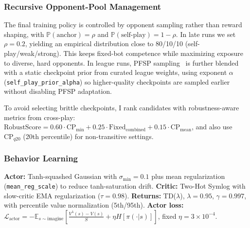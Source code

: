 \documentclass[11pt]{article}
\begin{document}
\subsubsection{Recursive Opponent-Pool Management}

The final training policy is controlled by opponent sampling rather than reward shaping, with $\mathbb{P}(\text{anchor})=\rho$ and $\mathbb{P}(\text{self-play})=1-\rho$.
In late runs we set $\rho=0.2$, yielding an empirical distribution close to 80/10/10 (self-play/weak/strong). This keeps fixed-bot competence while maximizing exposure to diverse, hard opponents.
In league runs, PFSP sampling~\cite{vinyals2019} is further blended with a static checkpoint prior from curated league weights, using exponent $\alpha$ (\texttt{self\_play\_prior\_alpha}) so higher-quality checkpoints are sampled earlier without disabling PFSP adaptation.

To avoid selecting brittle checkpoints, I rank candidates with robustness-aware metrics from cross-play:
$\text{RobustScore}=0.60\cdot \text{CP}_{\min}+0.25\cdot \text{Fixed}_{\text{combined}}+0.15\cdot \text{CP}_{\text{mean}}$, and also use $\text{CP}_{q20}$ (20th percentile) for non-transitive settings.

\subsubsection{Behavior Learning}

\textbf{Actor:} Tanh-squashed Gaussian with $\sigma_{\min}=0.1$ plus mean regularization (\texttt{mean\_reg\_scale}) to reduce tanh-saturation drift. \textbf{Critic:} Two-Hot Symlog with slow-critic EMA regularization ($\tau=0.98$). \textbf{Returns:} TD($\lambda$), $\lambda=0.95$, $\gamma=0.997$, with percentile value normalization (5th/95th). \textbf{Actor loss:} $\mathcal{L}_\text{actor}=-\mathbb{E}_{s\sim\text{imagine}}\!\left[\frac{V^\lambda(s)-V(s)}{S}+\eta H[\pi(\cdot|s)]\right]$, fixed $\eta=3\times10^{-4}$.
\end{document}
